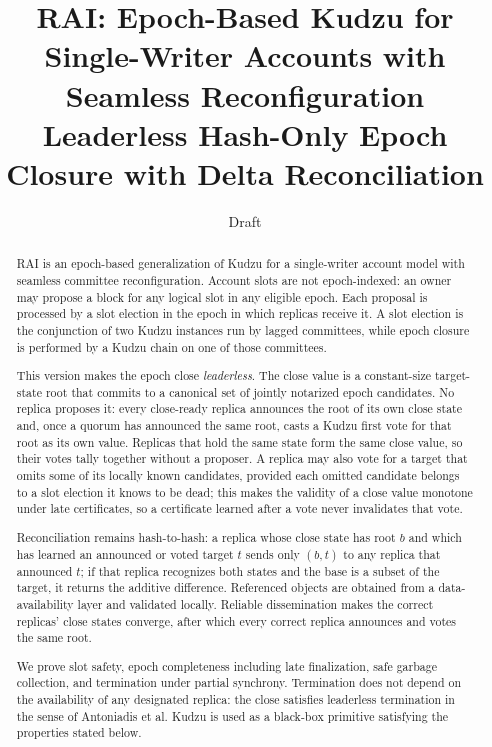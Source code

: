 \documentclass[11pt]{article}
\title{RAI: Epoch-Based Kudzu for Single-Writer Accounts with Seamless Reconfiguration\\
\large Leaderless Hash-Only Epoch Closure with Delta Reconciliation}
\author{}
\date{Draft}
\theoremstyle{remark}
\begin{document}
\maketitle

\begin{abstract}
RAI is an epoch-based generalization of Kudzu for a single-writer account model with seamless committee reconfiguration. Account slots are not epoch-indexed: an owner may propose a block for any logical slot in any eligible epoch. Each proposal is processed by a slot election in the epoch in which replicas receive it. A slot election is the conjunction of two Kudzu instances run by lagged committees, while epoch closure is performed by a Kudzu chain on one of those committees.

This version makes the epoch close \emph{leaderless}. The close value is a constant-size target-state root that commits to a canonical set of jointly notarized epoch candidates. No replica proposes it: every close-ready replica announces the root of its own close state and, once a quorum has announced the same root, casts a Kudzu first vote for that root as its own value. Replicas that hold the same state form the same close value, so their votes tally together without a proposer. A replica may also vote for a target that omits some of its locally known candidates, provided each omitted candidate belongs to a slot election it knows to be dead; this makes the validity of a close value monotone under late certificates, so a certificate learned after a vote never invalidates that vote.

Reconciliation remains hash-to-hash: a replica whose close state has root $b$ and which has learned an announced or voted target $t$ sends only $(b,t)$ to any replica that announced $t$; if that replica recognizes both states and the base is a subset of the target, it returns the additive difference. Referenced objects are obtained from a data-availability layer and validated locally. Reliable dissemination makes the correct replicas' close states converge, after which every correct replica announces and votes the same root.

We prove slot safety, epoch completeness including late finalization, safe garbage collection, and termination under partial synchrony. Termination does not depend on the availability of any designated replica: the close satisfies leaderless termination in the sense of Antoniadis et al. Kudzu is used as a black-box primitive satisfying the properties stated below.
\end{abstract}
\end{document}
